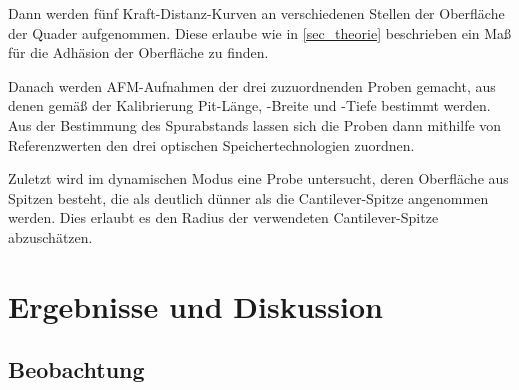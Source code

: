 \documentclass[
	a4paper,
	12pt,
	pagesize,
	ngerman
]{scrartcl}
\begin{document}
	Dann werden fünf Kraft-Distanz-Kurven an verschiedenen Stellen der Oberfläche der Quader aufgenommen.
	Diese erlaube wie in \cref{sec_theorie} beschrieben ein Maß für die Adhäsion der Oberfläche zu finden. %

	Danach werden AFM-Aufnahmen der drei zuzuordnenden Proben gemacht, aus denen gemäß der Kalibrierung Pit-Länge, -Breite und -Tiefe bestimmt werden.
	Aus der Bestimmung des Spurabstands lassen sich die Proben dann mithilfe von Referenzwerten den drei optischen Speichertechnologien zuordnen.

	Zuletzt wird im dynamischen Modus eine Probe untersucht, deren Oberfläche aus Spitzen besteht, die als deutlich dünner als die Cantilever-Spitze angenommen werden.
	Dies erlaubt es den Radius der verwendeten Cantilever-Spitze abzuschätzen. %

	\section{Ergebnisse und Diskussion}


	\subsection{Beobachtung}

\end{document}
